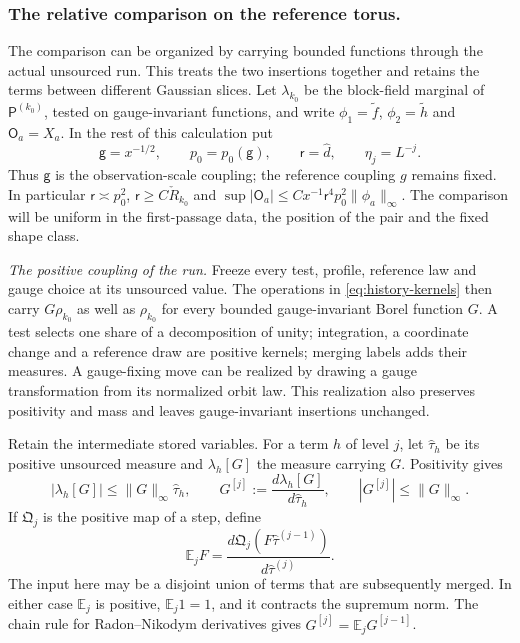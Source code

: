 \documentclass[11pt,letterpaper,reqno]{amsart}
\theoremstyle{definition}
\theoremstyle{remark}
\begin{document}
\subsubsection*{The relative comparison on the reference torus.}
\label{hyp:relative-two-point}
The comparison can be organized by carrying bounded functions through
the actual unsourced run. This treats the two insertions together and
retains the terms between different Gaussian slices. Let
$\lambda_{k_0}$ be the block-field marginal of
$\mathsf P^{(k_0)}$, tested on gauge-invariant functions, and write
$\phi_1=\tilde f$, $\phi_2=\tilde h$ and $\mathsf O_a=X_a$.
In the rest of this calculation put
\[
 \mathsf g=x^{-1/2},\qquad p_0=p_0(\mathsf g),\qquad
 \mathsf r=\hat d,\qquad \eta_j=L^{-j}.
\]
Thus $\mathsf g$ is the observation-scale coupling; the reference
coupling $g$ remains fixed. In particular
$\mathsf r\asymp p_0^2$, $\mathsf r\ge C\check R_{k_0}$ and
$\sup|\mathsf O_a|\le Cx^{-1}\mathsf r^4p_0^2
\|\phi_a\|_\infty$. The comparison will be uniform in the
first-passage data, the position of the pair and the fixed shape class.

\emph{The positive coupling of the run.}
Freeze every test, profile, reference law and gauge choice at its
unsourced value. The operations in \eqref{eq:history-kernels} then
carry $G\rho_{k_0}$ as well as $\rho_{k_0}$ for every bounded
gauge-invariant Borel function $G$. A test selects one share of a
decomposition of unity; integration, a coordinate change and a
reference draw are positive kernels; merging labels adds their
measures. A gauge-fixing move can be realized by drawing a gauge
transformation from its normalized orbit law. This realization also
preserves positivity and mass and leaves gauge-invariant insertions
unchanged.

Retain the intermediate stored variables. For a term $h$ of level $j$,
let $\hat\tau_h$ be its positive unsourced measure and
$\lambda_h[G]$ the measure carrying $G$. Positivity gives
\[
 |\lambda_h[G]|\le\|G\|_\infty\hat\tau_h,\qquad
 G^{[j]}:=\frac{d\lambda_h[G]}{d\hat\tau_h},\qquad
 |G^{[j]}|\le\|G\|_\infty.
\]
If $\mathfrak Q_j$ is the positive map of a step, define
\[
 \mathbb E_j F=
 \frac{d\mathfrak Q_j(F\hat\tau^{(j-1)})}
      {d\hat\tau^{(j)}}.
\]
The input here may be a disjoint union of terms that are subsequently
merged. In either case $\mathbb E_j$ is positive,
$\mathbb E_j1=1$, and it contracts the supremum norm. The chain rule
for Radon--Nikodym derivatives gives
$G^{[j]}=\mathbb E_jG^{[j-1]}$.
\end{document}

